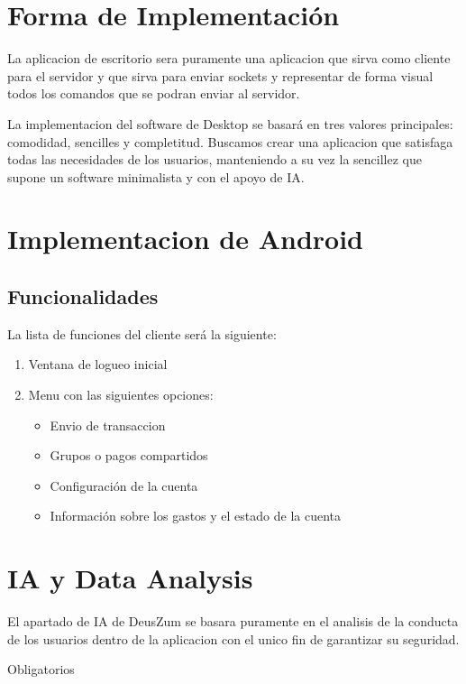 \documentclass{article}
\theoremstyle{definition}
\begin{document}
\section{Forma de Implementación}

La aplicacion de escritorio sera puramente una aplicacion que sirva como cliente para el servidor y que sirva para enviar sockets y representar de forma visual todos los comandos que se podran enviar al servidor.

La implementacion del software de Desktop se basará en tres valores principales: comodidad, sencilles y completitud. Buscamos crear una aplicacion que satisfaga todas las necesidades de los usuarios, manteniendo a su vez la sencillez que supone un software minimalista y con el apoyo de IA.




\section{Implementacion de Android}

\subsection{Funcionalidades}

La lista de funciones del cliente será la siguiente:
\begin{enumerate}
\item Ventana de logueo inicial
\item Menu con las siguientes opciones:\begin{itemize}
\item Envio de transaccion
\item Grupos o pagos compartidos
\item Configuración de la cuenta
\item Información sobre los gastos y el estado de la cuenta
\end{itemize}
\end{enumerate}


\section{IA y Data Analysis}

El apartado de IA de DeusZum se basara puramente en el analisis de la conducta de los usuarios dentro de la aplicacion con el unico fin de garantizar su seguridad.

Obligatorios
\end{document}
